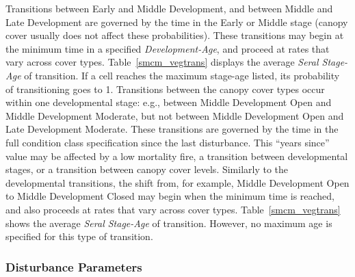Transitions between Early and Middle Development, and between Middle and Late Development are governed by the time in the Early or Middle stage (canopy cover usually does not affect these probabilities). These transitions may begin at the minimum time in a specified \emph{Development-Age}, and proceed at rates that vary across cover types. Table~\ref{smcm_vegtrans} displays the average \emph{Seral Stage-Age} of transition. If a cell reaches the maximum stage-age listed, its probability of transitioning goes to 1. Transitions between the canopy cover types occur within one developmental stage: e.g., between Middle Development Open and Middle Development Moderate, but not between Middle Development Open and Late Development Moderate. These transitions are governed by the time in the full condition class specification since the last disturbance. This ``years since'' value may be affected by a low mortality fire, a transition between developmental stages, or a transition between canopy cover levels. Similarly to the developmental transitions, the shift from, for example, Middle Development Open to Middle Development Closed may begin when the minimum time is reached, and also proceeds at rates that vary across cover types. Table~\ref{smcm_vegtrans} shows the average \emph{Seral Stage-Age} of transition. However, no maximum age is specified for this type of transition.

\subsubsection{Disturbance Parameters} 
\label{subsubsec:distparams}

